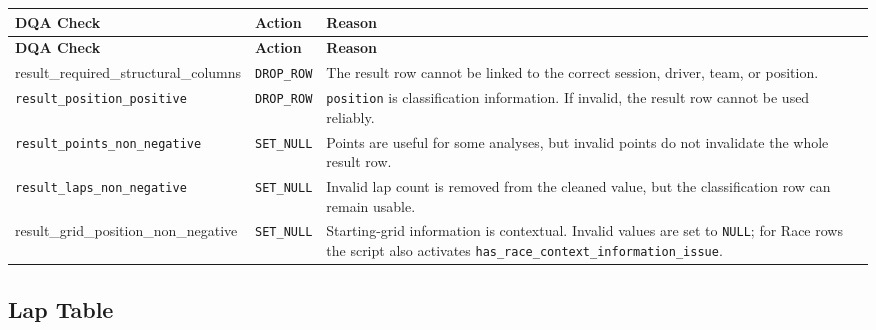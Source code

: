 \documentclass[a4paper,11pt]{article}
\begin{document}
	\begin{longtable}{p{6cm}p{2.5cm}p{6.4cm}}
		\toprule
		\textbf{DQA Check} & \textbf{Action} & \textbf{Reason} \\
		\midrule
		\endfirsthead
		
		\toprule
		\textbf{DQA Check} & \textbf{Action} & \textbf{Reason} \\
		\midrule
		\endhead
		
		\small{result\_required\_structural\_columns}
		& \texttt{DROP\_ROW}
		& The result row cannot be linked to the correct session, driver, team, or position. \\
		\midrule

		
		\texttt{result\_position\_positive}
		& \texttt{DROP\_ROW}
		& \texttt{position} is classification information. If invalid, the result row cannot be used reliably. \\
		\midrule
		
		\texttt{result\_points\_non\_negative}
		& \texttt{SET\_NULL}
		& Points are useful for some analyses, but invalid points do not invalidate the whole result row. \\
		\midrule
		
		\texttt{result\_laps\_non\_negative}
		& \texttt{SET\_NULL}
		& Invalid lap count is removed from the cleaned value, but the classification row can remain usable. \\
		\midrule
		
		\small{result\_grid\_position\_non\_negative}
		& \texttt{SET\_NULL}
		& Starting-grid information is contextual. Invalid values are set to \texttt{NULL};
		for Race rows the script also activates
		\texttt{has\_race\_context\_information\_issue}. \\
		\bottomrule
	\end{longtable}
	
	\subsection{Lap Table}
	
\end{document}
